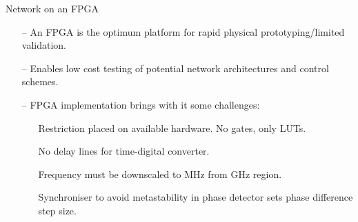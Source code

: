 \documentclass{beamer}
\begin{document}
\begin{frame}{Network on an FPGA}

    \begin{itemize}
        \item[--]
            An FPGA is the optimum platform for rapid physical prototyping/limited validation.
        \item[--]
        	Enables low cost testing of potential network architectures and control schemes.
        \item[--]
        	FPGA implementation brings with it some challenges:
        	\begin{itemize}
        		\item[]
        			Restriction placed on available hardware. No gates, only LUTs.
        		\item[]
        			No delay lines for time-digital converter.
        		\item[]
        			Frequency must be downscaled to MHz from GHz region.
        		\item[] 
        			Synchroniser to avoid metastability in phase detector sets phase difference step size.
        		
        	\end{itemize}
    \end{itemize}
 
\end{frame}
\end{document}
